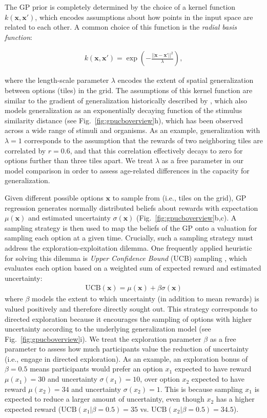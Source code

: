 \documentclass[a4paper,man, floatsintext, natbib]{apa6}
\begin{document}
The GP prior is completely determined by the choice of a kernel function $k(\mathbf{x}, \mathbf{x}')$, which encodes assumptions about how points in the input space are related to each other. A common choice of this function is the \emph{radial basis function}:

\begin{align}
k(\mathbf{x}, \mathbf{x}')=\exp\left(-\frac{||\mathbf{x}-\mathbf{x}'||^2}{\lambda}\right),
\end{align}

\noindent where the length-scale parameter $\lambda$ encodes the extent of spatial generalization between options (tiles) in the grid. The assumptions of this kernel function are similar to the gradient of generalization historically described by \cite{shepard1987toward}, which also models generalization as an exponentially decaying function of the stimulus similarity distance (see Fig.~\ref{fig:gpucboverview}h), which has been observed across a wide range of stimuli and organisms. As an example, generalization with $\lambda=1$ corresponds to the assumption that the rewards of two neighboring tiles are correlated by $r=0.6$, and that this correlation effectively decays to zero for options further than three tiles apart. We treat $\lambda$ as a free parameter in our model comparison in order to assess age-related differences in the capacity for generalization. 

Given different possible options $\mathbf{x}$ to sample from (i.e., tiles on the grid), GP regression generates normally distributed beliefs about rewards with expectation $\mu(\mathbf{x})$ and estimated uncertainty $\sigma(\mathbf{x})$ (Fig.~\ref{fig:gpucboverview}b,c). A sampling strategy is then used to map the beliefs of the GP onto a valuation for sampling each option at a given time. Crucially, such a sampling strategy must address the exploration-exploitation dilemma. One frequently applied heuristic for solving this dilemma is \emph{Upper Confidence Bound} (UCB) sampling \citep{srinivas2009gaussian}, which evaluates each option based on a weighted sum of expected reward and estimated uncertainty:
\begin{align}
\text{UCB}(\mathbf{x})=\mu(\mathbf{x})+\beta\sigma(\mathbf{x})
\end{align}
where $\beta$ models the extent to which uncertainty (in addition to mean rewards) is valued positively and therefore directly sought out. This strategy corresponds to directed exploration because it encourages the sampling of options with higher uncertainty according to the underlying generalization model (see Fig.~\ref{fig:gpucboverview}i). We treat the exploration parameter $\beta$ as a free parameter to assess how much participants value the reduction of uncertainty (i.e., engage in directed exploration). As an example, an exploration bonus of $\beta=0.5$ means participants would prefer an option $x_1$ expected to have reward $\mu(x_1)=30$ and uncertainty $\sigma(x_1)=10$, over option $x_2$ expected to have reward $\mu(x_2)=34$ and uncertainty $\sigma(x_2)=1$. This is because sampling $x_1$ is expected to reduce a larger amount of uncertainty, even though $x_2$ has a higher expected reward ($\text{UCB}(x_1|\beta=0.5)=35$ vs. $\text{UCB}(x_2|\beta=0.5)=34.5$).
\end{document}
